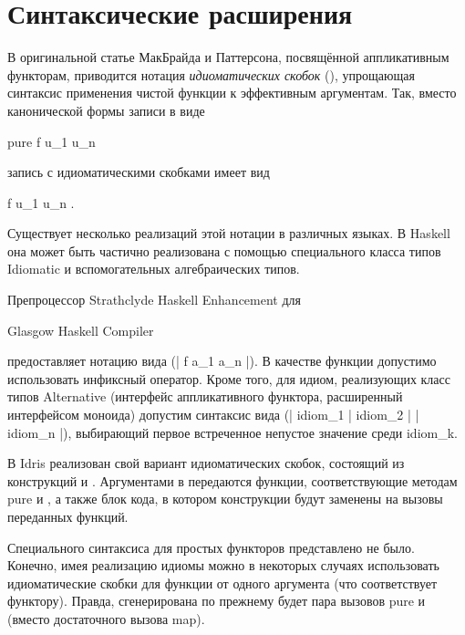 \section{Синтаксические расширения}
В оригинальной статье МакБрайда и Паттерсона\cite{McBride2008}, посвящённой аппликативным функторам, приводится нотация \emph{идиоматических скобок} (), упрощающая синтаксис применения чистой функции к эффективным аргументам. Так, вместо канонической формы записи в виде
\begin{haskell}
  pure f \circledast u_1 \circledast \dotsc \circledast u_n
\end{haskell}

запись с идиоматическими скобками имеет вид

\begin{haskell}
  \llbracket f u_1 \dotsc u_n \rrbracket.
\end{haskell}

Существует несколько реализаций этой нотации в различных языках. В Haskell она может быть частично реализована с помощью специального класса типов \<Idiomatic\> и вспомогательных алгебраических типов.

Препроцессор Strathclyde Haskell Enhancement\cite{mcbride2009strathclyde} для \begin{otherlanguage}{english}Glasgow Has\-kell Compiler\end{otherlanguage}\cite{jones1993glasgow} предоставляет нотацию вида \<(| f a_1 \dotsc a_n |)\>. В качестве функции допустимо использовать инфиксный оператор. Кроме того, для идиом, реализующих класс типов \<Alternative\>\cite{yorgey2009typeclassopedia} (интерфейс аппликативного функтора, расширенный интерфейсом моноида) допустим синтаксис вида \<(| idiom_1 | idiom_2 | \dotsc | idiom_n |)\>, выбирающий первое встреченное не\-пустое значение среди \<idiom_k\>.

В Idris реализован свой вариант идиоматических скобок\cite{Brady2013a}, состоящий из конструкций \<\> и \<[| expr |]\>. Аргументами в \<\> передаются функции, соответствующие методам \<pure\> и \<\circledast\>, а также блок кода, в котором конструкции \<[| expr |]\> будут заменены на вызовы переданных функций.

Специального синтаксиса для простых функторов представлено не было. Конечно, имея реализацию идиомы можно в некоторых случаях использовать идиоматические скобки для функции от одного аргумента (что соответствует функтору). Правда, сгенерирована по прежнему будет пара вызовов \<pure\> и \<\circledast\> (вместо достаточного вызова \<map\>).

